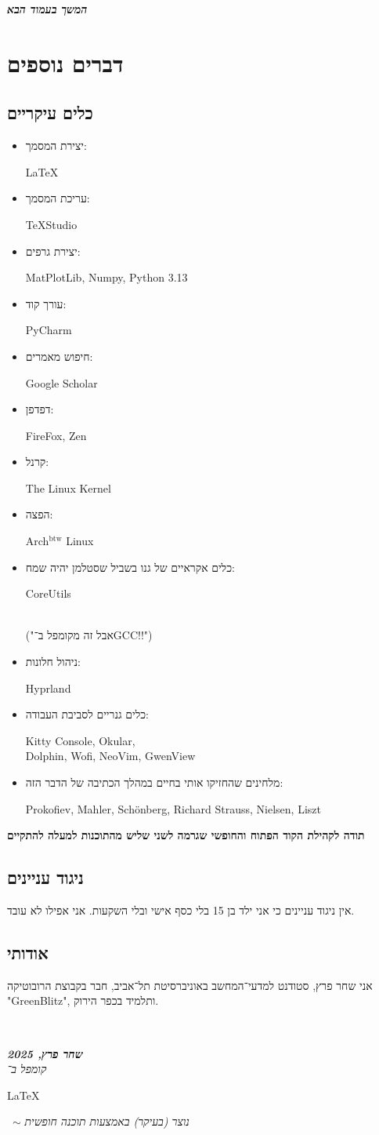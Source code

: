 \documentclass[]{article}
\newcommand\en[1] {\begin{otherlanguage}{english}#1\end{otherlanguage}}
\newcommand\npage {\vfil {\hfil \textbf{\textit{המשך בעמוד הבא}}} \hfil \vfil \pagebreak}
\newcommand\ndoc  {\dotfill \\ \vfil {\begin{center}
			{\textbf{\textit{שחר פרץ, 2025}} \\
				\scriptsize \textit{קומפל ב־}\en{\LaTeX}\, $\sim$ \textit{ נוצר (בעיקר) באמצעות תוכנה חופשית }}
	\end{center}} \vfil	}
\theoremstyle{definition}
\begin{document}
	\npage
	\section{דברים נוספים}
	\subsection{כלים עיקריים}
	\begin{multicols}{2}
		\begin{itemize}
			\item יצירת המסמך: \hfill \en{\LaTeX}
			\item עריכת המסמך: \hfill \en{\TeX Studio}
			\item יצירת גרפים: \hfill \en{MatPlotLib, Numpy, Python 3.13}
			\item עורך קוד: \hfill \en{PyCharm}
			\item חיפוש מאמרים: \hfill \en{Google Scholar}
			\item דפדפן: \hfill \en{FireFox, Zen}
			\item קרנל: \hfill \en{The Linux Kernel}
			\item הפצה: \hfill \en{Arch$^{\text{btw}}$ Linux}
			\item כלים אקראיים של גנו בשביל שסטלמן יהיה שמח: \hfill \en{CoreUtils} \\
			("אבל זה מקומפל ב־GCC!!")
			\item ניהול חלונות: \hfill \en{Hyprland}
			\item כלים גנריים לסביבת העבודה: \hfill \en{Kitty Console, Okular, \\ Dolphin, Wofi, NeoVim, GwenView \hfill}
			\item מלחינים שהחזיקו אותי בחיים במהלך הכתיבה של הדבר הזה: \hfill \en{Prokofiev, Mahler, Schönberg, Richard Strauss, Nielsen, Liszt \hfill}
		\end{itemize}
	\end{multicols}
	
	\hfil \textbf{תודה לקהילת הקוד הפתוח והחופשי שגרמה לשני שליש מהתוכנות למעלה להתקיים}
	
	\subsection{ניגוד עניינים}
	אין ניגוד עניינים כי אני ילד בן 15 בלי כסף אישי ובלי השקעות. אני אפילו לא עובד. 
	
	\subsection{אודותי}
	אני שחר פרץ, סטודנט למדעי־המחשב באוניברסיטת תל־אביב, חבר בקבוצת הרובוטיקה "GreenBlitz", ותלמיד בכפר הירוק. 
	
	
	
	\ndoc
\end{document}
